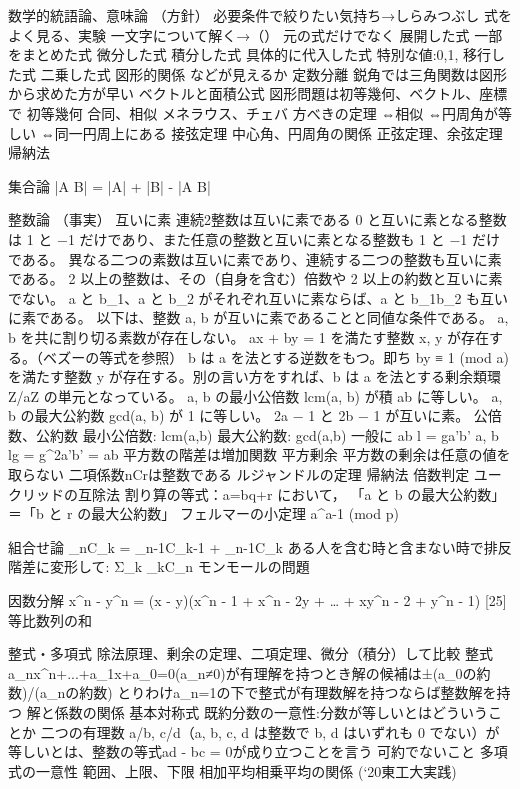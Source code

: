 \documentclass[dvipdfmx,uplatex]{jsarticle}
\begin{document}
数学的統語論、意味論
（方針）
必要条件で絞りたい気持ち→しらみつぶし
式をよく見る、実験
一文字について解く→（）\in {}
元の式だけでなく
展開した式
一部をまとめた式
微分した式
積分した式
具体的に代入した式
特別な値:0,1,
移行した式
二乗した式
図形的関係
などが見えるか
定数分離
鋭角では三角関数は図形から求めた方が早い
ベクトルと面積公式
図形問題は初等幾何、ベクトル、座標で
初等幾何
合同、相似
メネラウス、チェバ
方べきの定理
⇔相似
⇔円周角が等しい
⇔同一円周上にある
接弦定理
中心角、円周角の関係
正弦定理、余弦定理
帰納法

集合論
|A \cup B| = |A| + |B| - |A \cap B|

整数論
（事実）
互いに素
連続2整数は互いに素である
0 と互いに素となる整数は 1 と −1 だけであり、また任意の整数と互いに素となる整数も 1 と −1 だけである。
異なる二つの素数は互いに素であり、連続する二つの整数も互いに素である。
2 以上の整数は、その（自身を含む）倍数や 2 以上の約数と互いに素でない。
a と b_1、a と b_2 がそれぞれ互いに素ならば、a と b_1b_2 も互いに素である。
以下は、整数 a, b が互いに素であることと同値な条件である。
a, b を共に割り切る素数が存在しない。
ax + by = 1 を満たす整数 x, y が存在する。（ベズーの等式を参照）
b は a を法とする逆数をもつ。即ち by ≡ 1 (mod a) を満たす整数 y が存在する。別の言い方をすれば、b は a を法とする剰余類環 Z/aZ の単元となっている。
a, b の最小公倍数 lcm(a, b) が積 ab に等しい。
a, b の最大公約数 gcd(a, b) が 1 に等しい。
2a − 1 と 2b − 1 が互いに素。
公倍数、公約数
最小公倍数: lcm(a,b)
最大公約数: gcd(a,b)
一般に ab \gq l = ga'b' \gq a, b
lg = g^2a'b' = ab
平方数の階差は増加関数
平方剰余
平方数の剰余は任意の値を取らない
二項係数nCrは整数である
ルジャンドルの定理
帰納法
倍数判定
ユークリッドの互除法
割り算の等式：a=bq+r において，
「a と b の最大公約数」
＝「b と r の最大公約数」
フェルマーの小定理
a^{a-1}  (mod p)

組合せ論
_nC_k = _{n-1}C_{k-1} + _{n-1}C_{k}
ある人を含む時と含まない時で排反
階差に変形して: Σ_k _kC_n
モンモールの問題

因数分解
x^n - y^n = (x - y)(x^{n - 1} + x^{n - 2}y + … + xy^{n - 2} + y^{n - 1}) [25]
等比数列の和

整式・多項式
除法原理、剰余の定理、二項定理、微分（積分）して比較
整式a_nx^n+...+a_1x+a_0=0(a_n≠0)が有理解を持つとき解の候補は±(a_0の約数)/(a_nの約数)
とりわけa_n=1の下で整式が有理数解を持つならば整数解を持つ
解と係数の関係
基本対称式
既約分数の一意性:分数が等しいとはどういうことか
二つの有理数 a/b, c/d（a, b, c, d は整数で b, d はいずれも 0 でない）が等しいとは、整数の等式ad - bc = 0が成り立つことを言う
可約でないこと
多項式の一意性
範囲、上限、下限
相加平均相乗平均の関係
(‘20東工大実践)
\end{document}
